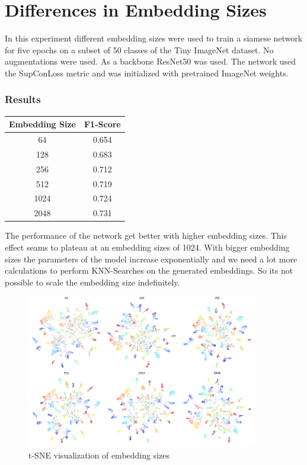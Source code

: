 \documentclass[12pt,a4paper]{report}
\begin{document}
\newpage

\section{Differences in Embedding Sizes}

In this experiment different embedding sizes were used to train a siamese network for five epochs on a subset of 50 classes of the Tiny ImageNet dataset.
No augmentations were used.
As a backbone ResNet50 was used.
The network used the SupConLoss metric and was initialized with pretrained ImageNet weights.


\subsubsection{Results}
\begin{table}
	\begin{tabular}{ | c | c | }
		\hline
		Embedding Size &  F1-Score \\ 
		\hline
		64 &  0.654 \\ 
		\hline
		128 & 0.683 \\ 
		\hline
		256 & 0.712 \\ 
		\hline
		512 & 0.719 \\ 
		\hline
		1024 & 0.724  \\ 
		\hline
		2048 & 0.731 \\ 
		\hline
	\end{tabular}
\end{table} 

The performance of the network get better with higher embedding sizes.
This effect seams to plateau at an embedding sizes of 1024.
With bigger embedding sizes the parameters of the model increase exponentially and we need a lot more calculations to perform KNN-Searches on the generated embeddings.
So its not possible to scale the embedding size indefinitely.


\begin{figure}[hb]
	\centering
	\includegraphics[width=0.9\textwidth]{../plots/embedding_size.png}
	\caption{t-SNE visualization of embedding sizes}
\end{figure}
\end{document}
